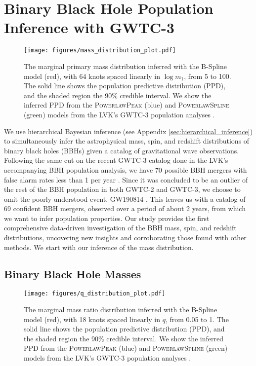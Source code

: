 \section{Binary Black Hole Population Inference with GWTC-3} \label{sec:results}

\begin{figure*}[ht!]
    \begin{centering}
        \texttt{[image: figures/mass\_distribution\_plot.pdf]}
        \caption{The marginal primary mass distribution inferred with the B-Spline model (red), with 64 knots spaced linearly in $\log m_1$, from 5\msun 
        to 100\msun. The solid line shows the population predictive distribution (PPD), and the shaded region 
        the 90\% credible interval. We show the inferred PPD from the \textsc{PowerlawPeak} (blue) and \textsc{PowerlawSpline} (green) models 
        from the LVK's GWTC-3 population analyses \citep{o3b_astro_dist}.}
        \label{fig:mass_distribution}
    \end{centering}
\end{figure*}

We use hierarchical Bayesian inference (see Appendix \ref{sec:hierarchical_inference}) to simultaneously infer the astrophysical mass, spin, and redshift distributions of 
binary black holes (BBHs) given a catalog of gravitational wave observations. Following the same cut on the recent GWTC-3 catalog done in the LVK's 
accompanying BBH population analysis, we have 70 possible BBH mergers with false alarm rates less than 1 per year \citep{GWTC3,o3b_astro_dist,GWTC3DATA}. Since it was concluded to be an outlier of the rest of 
the BBH population in both GWTC-2 and GWTC-3, we choose to omit the poorly understood event, GW190814 \citep{190814disc,o3a_pop,o3b_astro_dist,Essick_2022}. This leaves us with 
a catalog of 69 confident BBH mergers, observed over a period of about 2 years, from which we want to infer population properties. Our study provides the first comprehensive 
data-driven investigation of the BBH mass, spin, and redshift distributions, uncovering new insights and corroborating those found with other methods. 
We start with our inference of the mass distribution.

\subsection{Binary Black Hole Masses} \label{sec:mass_dist}

\begin{figure}[ht!]
    \texttt{[image: figures/q\_distribution\_plot.pdf]}
    \caption{The marginal mass ratio distribution inferred with the B-Spline model (red), with 18 knots spaced linearly in $q$, from 0.05 to 1. The solid line shows the population predictive distribution (PPD), and the shaded region the 90\% credible interval. 
    We show the inferred PPD from the \textsc{PowerlawPeak} (blue) and \textsc{PowerlawSpline} (green) models from the LVK's GWTC-3 population analyses \citep{o3b_astro_dist}.}
    \label{fig:q_distribution}
\end{figure}

